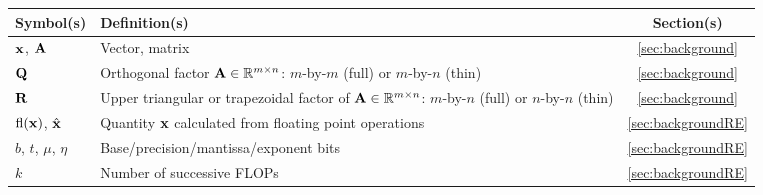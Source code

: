\begin{table}[H]
	\centering
	\begin{tabular}{|m{1.7cm}|m{10.3cm}|c|}
		\hline
		Symbol(s) & Definition(s) & Section(s) \\ \hline
		${\mathbf{x}}$, ${\mathbf{A}}$  & Vector, matrix  & \ref{sec:background} \\
		\hline
		$\mathbf{Q}$  & Orthogonal factor $\mathbf{A}\in\mathbb{R}^{m\times n}$: $m$-by-$m$ (full) or $m$-by-$n$ (thin)  & \ref{sec:background}\\
		$\mathbf{R}$ & Upper triangular or trapezoidal factor of $\mathbf{A}\in\mathbb{R}^{m\times n}$:  $m$-by-$n$ (full) or $n$-by-$n$ (thin)  &  \ref{sec:background}\\ 
		\hline
		$\mathrm{fl}(\mathbf{x})$, $\hat{\mathbf{x}}$ & Quantity $\mathbf{x}$ calculated from floating point operations & \ref{sec:backgroundRE} \\
		$b$, $t$, $\mu$, $\eta$  & Base/precision/mantissa/exponent bits & \ref{sec:backgroundRE} \\
		$k$ & Number of successive FLOPs &  \ref{sec:backgroundRE}\\

\end{tabular}
\end{table}

